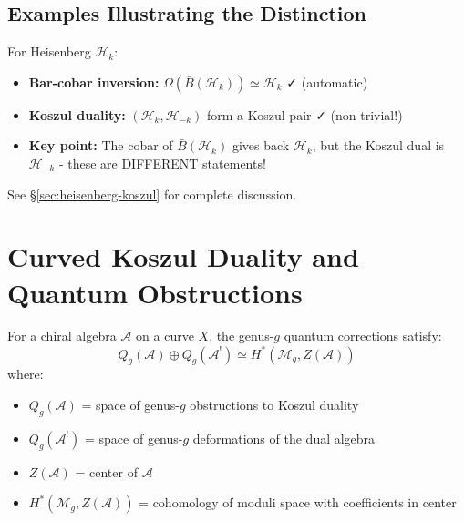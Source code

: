 \subsection{Examples Illustrating the Distinction}

\begin{example}\label{ex:heisenberg-koszul-vs-barcobar}
For Heisenberg $\mathcal{H}_k$:
\begin{itemize}
\item \textbf{Bar-cobar inversion:} $\Omega(\bar{B}(\mathcal{H}_k)) \simeq \mathcal{H}_k$ ✓ (automatic)
\item \textbf{Koszul duality:} $(\mathcal{H}_k, \mathcal{H}_{-k})$ form a Koszul pair ✓ (non-trivial!)
\item \textbf{Key point:} The cobar of $\bar{B}(\mathcal{H}_k)$ gives back $\mathcal{H}_k$, but the Koszul dual is $\mathcal{H}_{-k}$ - these are DIFFERENT statements!
\end{itemize}

See \S\ref{sec:heisenberg-koszul} for complete discussion.
\end{example}

\section{Curved Koszul Duality and Quantum Obstructions}
\label{sec:curved-koszul-quantum}

\begin{theorem}\label{thm:deformation-obstruction}
For a chiral algebra $\mathcal{A}$ on a curve $X$, the genus-$g$ quantum corrections 
satisfy:
$$Q_g(\mathcal{A}) \oplus Q_g(\mathcal{A}^!) \simeq H^*(\mathcal{M}_g, Z(\mathcal{A}))$$
where:
\begin{itemize}
\item $Q_g(\mathcal{A})$ = space of genus-$g$ obstructions to Koszul duality
\item $Q_g(\mathcal{A}^!)$ = space of genus-$g$ deformations of the dual algebra
\item $Z(\mathcal{A})$ = center of $\mathcal{A}$
\item $H^*(\mathcal{M}_g, Z(\mathcal{A}))$ = cohomology of moduli space with coefficients in center
\end{itemize}
\end{theorem}

